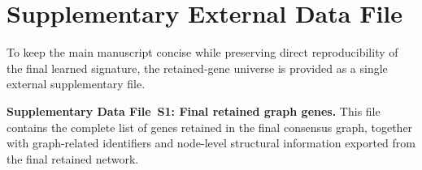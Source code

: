 \documentclass[11pt,a4paper]{article}
\begin{document}

\clearpage
\section*{Supplementary External Data File}

\noindent
To keep the main manuscript concise while preserving direct reproducibility of the final learned signature, the retained-gene universe is provided as a single external supplementary file.

\noindent\textbf{Supplementary Data File~S1: Final retained graph genes.}
This file contains the complete list of genes retained in the final consensus graph, together with graph-related identifiers and node-level structural information exported from the final retained network.

\printbibliography[heading=none]
\end{document}
